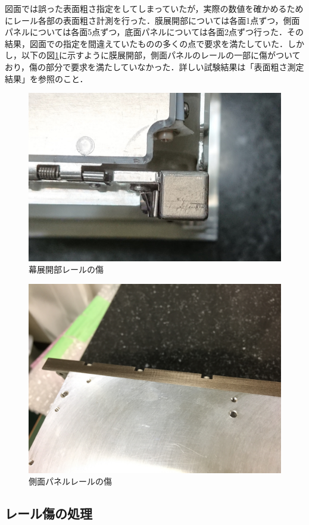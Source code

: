 図面では誤った表面粗さ指定をしてしまっていたが，実際の数値を確かめるためにレール各部の表面粗さ計測を行った．膜展開部については各面1点ずつ，側面パネルについては各面5点ずつ，底面パネルについては各面2点ずつ行った．その結果，図面での指定を間違えていたものの多くの点で要求を満たしていた．しかし，以下の図\ref{fig:scratch1}に示すように膜展開部，側面パネルのレールの一部に傷がついており，傷の部分で要求を満たしていなかった．詳しい試験結果は「表面粗さ測定結果」を参照のこと．

\begin{figure}[h]
	\begin{center}
		
		\includegraphics[width=0.6\linewidth]{04/fig/scratch1.jpg}
		\caption{幕展開部レールの傷}
		\label{fig:scratch1}
		
	\end{center}
\end{figure}

\begin{figure}[h]
	\begin{center}
		
		\includegraphics[width=0.6\linewidth]{04/fig/scratch2.jpg}
		\caption{側面パネルレールの傷}
		\label{fig:scratch2}
		
	\end{center}
\end{figure}

\subsection{レール傷の処理}

